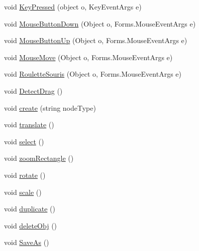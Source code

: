 \begin{DoxyCompactItemize}
\item 
void \hyperlink{class_interface_graphique_1_1_editor_controller_ab894ff912a93b72593ea550cf54d91a5}{Key\+Pressed} (object o, Key\+Event\+Args e)
\item 
void \hyperlink{class_interface_graphique_1_1_editor_controller_aa934c272adf993f848869161ac86c86f}{Mouse\+Button\+Down} (Object o, Forms.\+Mouse\+Event\+Args e)
\item 
void \hyperlink{class_interface_graphique_1_1_editor_controller_a12879f41296e60eb88ae423b8540889a}{Mouse\+Button\+Up} (Object o, Forms.\+Mouse\+Event\+Args e)
\item 
void \hyperlink{class_interface_graphique_1_1_editor_controller_a61f00ff89b804b18f701e7d25b912cbc}{Mouse\+Move} (Object o, Forms.\+Mouse\+Event\+Args e)
\item 
void \hyperlink{class_interface_graphique_1_1_editor_controller_a497e7bf59e68d6651649048fb4c31952}{Roulette\+Souris} (Object o, Forms.\+Mouse\+Event\+Args e)
\item 
void \hyperlink{class_interface_graphique_1_1_editor_controller_ac1e015d2cd0a55e076dfcf368e4af5ad}{Detect\+Drag} ()
\item 
void \hyperlink{class_interface_graphique_1_1_editor_controller_a1e71ac2cfc670ff2d239863589123876}{create} (string node\+Type)
\item 
void \hyperlink{class_interface_graphique_1_1_editor_controller_a5a2edbb1d6be9ae097c2c8a2c588d5cc}{translate} ()
\item 
void \hyperlink{class_interface_graphique_1_1_editor_controller_a89ccf4671fc741af80c908374c0feedf}{select} ()
\item 
void \hyperlink{class_interface_graphique_1_1_editor_controller_ab0df0ca1c47e3d84033a9c37f40bf1de}{zoom\+Rectangle} ()
\item 
void \hyperlink{class_interface_graphique_1_1_editor_controller_af47230912ff563ebdd7227344a71bbd5}{rotate} ()
\item 
void \hyperlink{class_interface_graphique_1_1_editor_controller_a861a98d3985e846b685bec518ed2cf73}{scale} ()
\item 
void \hyperlink{class_interface_graphique_1_1_editor_controller_aa171e0b5ea76131c868b12a6adc63cce}{duplicate} ()
\item 
void \hyperlink{class_interface_graphique_1_1_editor_controller_ad86294c955d7826b49838b849f7cedc5}{delete\+Obj} ()
\item 
void \hyperlink{class_interface_graphique_1_1_editor_controller_aee3e9f4ced30bc8aeaeba7b8456dc614}{Save\+As} ()

\end{DoxyCompactItemize}
